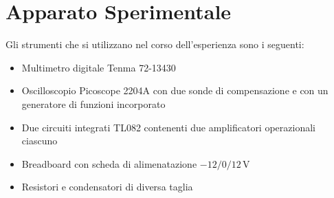 \documentclass[a4paper,11pt]{article}
\begin{document}


\section{Apparato Sperimentale}
Gli strumenti che si utilizzano nel corso dell'esperienza sono i seguenti:
\begin{itemize}
	\item Multimetro digitale Tenma 72-13430
  	\item Oscilloscopio Picoscope 2204A con due sonde di compensazione e con un generatore di funzioni incorporato
  \item Due circuiti integrati TL082 contenenti due amplificatori operazionali
        ciascuno
	\item Breadboard con scheda di alimenatazione $-12/0/12\, \si{\volt}$
	\item Resistori e condensatori di diversa taglia
\end{itemize}




\end{document}
